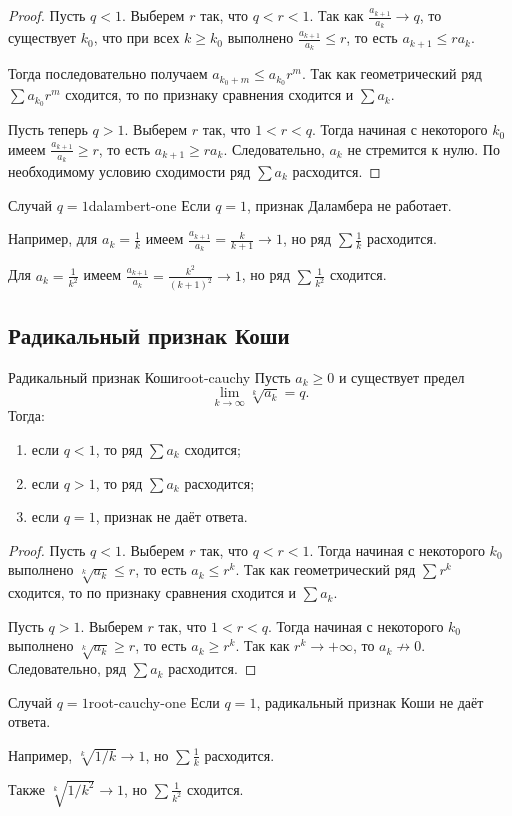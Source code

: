 \begin{proof}
	Пусть $q<1$. Выберем $r$ так, что $q<r<1$. Так как $\frac{a_{k+1}}{a_k}\to q$, то существует $k_0$, что при всех $k\ge k_0$ выполнено $\frac{a_{k+1}}{a_k}\le r$, то есть $a_{k+1}\le r a_k$.
	
	Тогда последовательно получаем $a_{k_0+m}\le a_{k_0}r^m$. Так как геометрический ряд $\sum a_{k_0}r^m$ сходится, то по признаку сравнения сходится и $\sum a_k$.
	
	Пусть теперь $q>1$. Выберем $r$ так, что $1<r<q$. Тогда начиная с некоторого $k_0$ имеем $\frac{a_{k+1}}{a_k}\ge r$, то есть $a_{k+1}\ge r a_k$. Следовательно, $a_k$ не стремится к нулю. По необходимому условию сходимости ряд $\sum a_k$ расходится.
\end{proof}

\begin{Remark}{Случай $q=1$}{dalambert-one}
	Если $q=1$, признак Даламбера не работает.
	
	Например, для $a_k=\frac1k$ имеем $\frac{a_{k+1}}{a_k}=\frac{k}{k+1}\to 1$, но ряд $\sum \frac1k$ расходится.
	
	Для $a_k=\frac1{k^2}$ имеем $\frac{a_{k+1}}{a_k}=\frac{k^2}{(k+1)^2}\to 1$, но ряд $\sum \frac1{k^2}$ сходится.
\end{Remark}

\subsection{Радикальный признак Коши}

\begin{Theorem}{Радикальный признак Коши}{root-cauchy}
	Пусть $a_k \ge 0$ и существует предел
	\[
	\lim_{k\to\infty} \sqrt[k]{a_k} = q.
	\]
	Тогда:
	
	\begin{enumerate}
		\item если $q<1$, то ряд $\sum a_k$ сходится;
		\item если $q>1$, то ряд $\sum a_k$ расходится;
		\item если $q=1$, признак не даёт ответа.
	\end{enumerate}
\end{Theorem}

\begin{proof}
	Пусть $q<1$. Выберем $r$ так, что $q<r<1$. Тогда начиная с некоторого $k_0$ выполнено $\sqrt[k]{a_k}\le r$, то есть $a_k\le r^k$. Так как геометрический ряд $\sum r^k$ сходится, то по признаку сравнения сходится и $\sum a_k$.
	
	Пусть $q>1$. Выберем $r$ так, что $1<r<q$. Тогда начиная с некоторого $k_0$ выполнено $\sqrt[k]{a_k}\ge r$, то есть $a_k\ge r^k$. Так как $r^k\to+\infty$, то $a_k\not\to0$. Следовательно, ряд $\sum a_k$ расходится.
\end{proof}

\begin{Remark}{Случай $q=1$}{root-cauchy-one}
	Если $q=1$, радикальный признак Коши не даёт ответа.
	
	Например, $\sqrt[k]{1/k}\to1$, но $\sum\frac1k$ расходится.
	
	Также $\sqrt[k]{1/k^2}\to1$, но $\sum\frac1{k^2}$ сходится.
\end{Remark}
